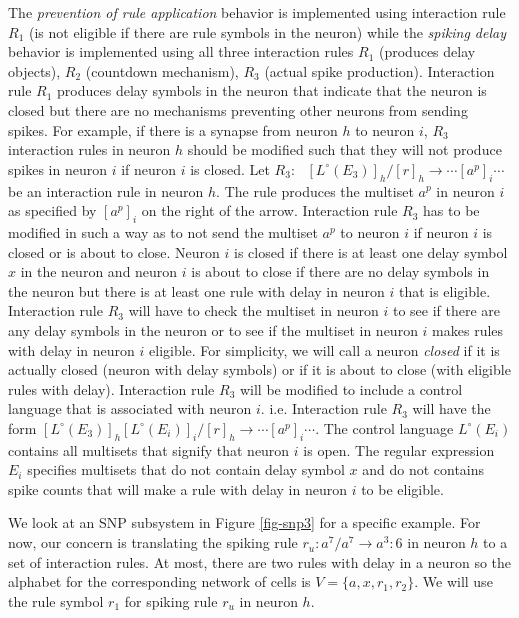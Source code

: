 \documentclass[a4paper]{article}
\theoremstyle{definition}
\newcommand{\ra}{\rightarrow}
\newcommand{\ts}{\text{ }}
\begin{document}
The \emph{prevention of rule application} behavior is implemented using interaction rule $R_1$ (is 
not eligible if there are rule symbols in the neuron) while the \emph{spiking delay} behavior is 
implemented using all three interaction rules $R_1$ (produces delay objects), $R_2$ (countdown
mechanism), $R_3$ (actual spike production). Interaction rule $R_1$ produces delay symbols in the 
neuron that indicate that the neuron is closed but there are no mechanisms preventing other neurons
from sending spikes. For example, if there is a synapse from neuron $h$ to neuron $i$, $R_3$ 
interaction rules in neuron $h$ should be modified such that they will not produce spikes in neuron
$i$ if neuron $i$ is closed. Let $R_3:\ts [L^{\circ}(E_3)]_h / [r]_h  \ra \cdots[a^p]_{i}\cdots$ be
an interaction rule in neuron $h$. The rule produces the multiset $a^p$ in neuron $i$ as specified
by ${[a^p]}_{i}$ on the right of the arrow. Interaction rule $R_3$ has to be modified in such a
way as to not send the multiset $a^p$ to neuron $i$ if neuron $i$ is closed or is about to close.
Neuron $i$ is closed if there is at least one delay symbol $x$ in the neuron and neuron $i$ is about 
to close if there are no delay symbols in the neuron but there is at least one rule with delay in 
neuron $i$ that is eligible. Interaction rule $R_3$ will have to check the multiset in neuron $i$
to see if there are any delay symbols in the neuron or to see if the multiset in neuron $i$ makes
rules with delay in neuron $i$ eligible. For simplicity, we will call a neuron \emph{closed} if it 
is actually closed (neuron with delay symbols) or if it is about to close (with eligible rules with
delay). Interaction rule $R_3$ will be modified to include a control language that is associated 
with neuron $i$. i.e. Interaction rule $R_3$ will have the form 
${[L^{\circ}(E_3)]}_h{[L^{\circ}(E_i)]}_i/{[r]}_h\ra \cdots {[a^p]}_i \cdots$. The control language
$L^{\circ}(E_i)$ contains all multisets that signify that neuron $i$ is open. The regular expression
$E_i$ specifies multisets that do not contain delay symbol $x$ and do not contains spike counts that
will make a rule with delay in neuron $i$ to be eligible. 

We look at an SNP subsystem in Figure \ref{fig-snp3} for a specific example. For now, our concern is
translating the spiking rule $r_u: a^7/a^7 \ra a^3: 6$ in neuron $h$ to a set of interaction rules. 
At most, there are two rules with delay in a neuron so the alphabet for the corresponding network of
cells is $V=\{a,x,r_1,r_2\}$. We will use the rule symbol $r_1$ for spiking rule $r_u$ in neuron 
$h$. 
\end{document}
